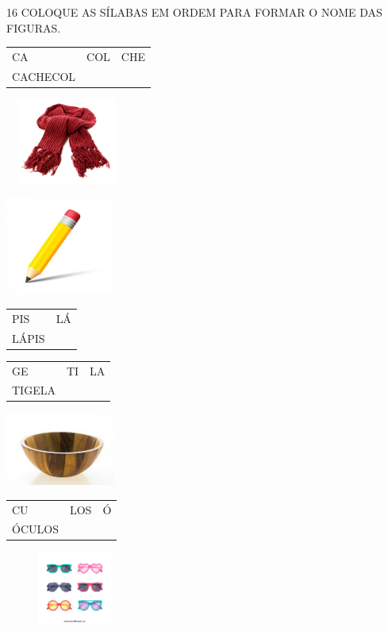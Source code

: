 \num{16} COLOQUE AS SÍLABAS EM ORDEM PARA FORMAR O NOME DAS FIGURAS.


\begin{longtable}[]{@{}lll@{}}
\toprule
CA & COL & CHE\tabularnewline
CACHECOL\tabularnewline
\bottomrule
\end{longtable}

\includegraphics[width=1.59418in,height=1.11488in]{media/image77.png}

\includegraphics[width=1.39583in,height=1.25000in]{media/image78.png}

\begin{longtable}[]{@{}ll@{}}
\toprule
PIS & LÁ\tabularnewline
LÁPIS\tabularnewline
\bottomrule
\end{longtable}

\begin{longtable}[]{@{}lll@{}}
\toprule
GE & TI & LA\tabularnewline
TIGELA\tabularnewline
\bottomrule
\end{longtable}

\includegraphics[width=1.41771in,height=0.94514in]{media/image79.jpg}

\begin{longtable}[]{@{}lll@{}}
\toprule
CU & LOS & Ó\tabularnewline
ÓCULOS\tabularnewline
\bottomrule
\end{longtable}

\includegraphics[width=1.78518in,height=0.95594in]{media/image80.png}

